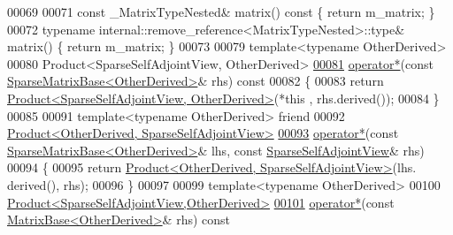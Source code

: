 \begin{DoxyCode}
00069 
00071     \textcolor{keyword}{const} \_MatrixTypeNested& matrix()\textcolor{keyword}{ const }\{ \textcolor{keywordflow}{return} m\_matrix; \}
00072     \textcolor{keyword}{typename} internal::remove\_reference<MatrixTypeNested>::type& matrix() \{ \textcolor{keywordflow}{return} m\_matrix; \}
00073 
00079     \textcolor{keyword}{template}<\textcolor{keyword}{typename} OtherDerived>
00080     Product<SparseSelfAdjointView, OtherDerived>
\hyperlink{group___sparse_core___module_a9d1e5ef26775e3b43be08fd4ae191aa8}{00081}     \hyperlink{group___sparse_core___module_a9d1e5ef26775e3b43be08fd4ae191aa8}{operator*}(\textcolor{keyword}{const} \hyperlink{group___sparse_core___module_class_eigen_1_1_sparse_matrix_base}{SparseMatrixBase<OtherDerived>}& rhs)\textcolor{keyword}{ const}
00082 \textcolor{keyword}{    }\{
00083       \textcolor{keywordflow}{return} \hyperlink{group___core___module_class_eigen_1_1_product}{Product<SparseSelfAdjointView, OtherDerived>}(*\textcolor{keyword}{this}
      , rhs.derived());
00084     \}
00085 
00091     \textcolor{keyword}{template}<\textcolor{keyword}{typename} OtherDerived> \textcolor{keyword}{friend}
00092     \hyperlink{group___core___module_class_eigen_1_1_product}{Product<OtherDerived, SparseSelfAdjointView>}
\hyperlink{group___sparse_core___module_a9bbe41a5c050f8067d4fe77372eb0b7a}{00093}     \hyperlink{group___sparse_core___module_a9bbe41a5c050f8067d4fe77372eb0b7a}{operator*}(\textcolor{keyword}{const} \hyperlink{group___sparse_core___module_class_eigen_1_1_sparse_matrix_base}{SparseMatrixBase<OtherDerived>}& lhs, \textcolor{keyword}{const} 
      \hyperlink{group___sparse_core___module_class_eigen_1_1_sparse_self_adjoint_view}{SparseSelfAdjointView}& rhs)
00094     \{
00095       \textcolor{keywordflow}{return} \hyperlink{group___core___module_class_eigen_1_1_product}{Product<OtherDerived, SparseSelfAdjointView>}(lhs.
      derived(), rhs);
00096     \}
00097     
00099     \textcolor{keyword}{template}<\textcolor{keyword}{typename} OtherDerived>
00100     \hyperlink{group___core___module_class_eigen_1_1_product}{Product<SparseSelfAdjointView,OtherDerived>}
\hyperlink{group___sparse_core___module_a887e3b5fa468af8413276141ddc8bb93}{00101}     \hyperlink{group___sparse_core___module_a887e3b5fa468af8413276141ddc8bb93}{operator*}(\textcolor{keyword}{const} \hyperlink{group___core___module_class_eigen_1_1_matrix_base}{MatrixBase<OtherDerived>}& rhs)\textcolor{keyword}{ const}

\end{DoxyCode}

